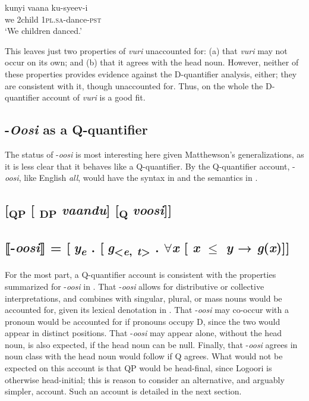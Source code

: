\documentclass[output=paper]{langsci/langscibook}
\begin{document}
\ea
\gll kunyi  vaana    ku-syeev-i\\
     we  2child    1\textsc{pl}.\textsc{sa}{}-dance-\textsc{pst}  \\
\glt ‘We children danced.’
\z

  This leaves just two properties of \textit{vuri} unaccounted for: (a) that \textit{vuri} may not occur on its own; and (b) that it agrees with the head noun. However, neither of these properties provides evidence against the D-quantifier analysis, either; they are consistent with it, though unaccounted for. Thus, on the whole the D-quantifier account of \textit{vuri} is a good fit.

\subsection{{}-\textit{Oosi} as a Q-quantifier}

The status of -\textit{oosi} is most interesting here given Matthewson's generalizations, as it is less clear that\textit{} it behaves like a Q-quantifier. By the Q-quantifier account, -\textit{oosi}, like English \textit{all}, would have the syntax in  and the semantics in .

\subsection{      [\textsubscript{QP} [\textsubscript{ DP} \textit{vaandu}] [\textsubscript{Q} \textit{voosi}]]}
\subsection{      ⟦{}-\textit{oosi}⟧ = [\textit{y}\textit{\textsubscript{e}} . [\textit{g}\textsubscript{<}\textit{\textsubscript{e}}\textsubscript{,} \textit{\textsubscript{t}}\textsubscript{>}\textit{}  . ${\forall}$\textit{x} [ \textit{x} ${\leq}$\textit{ y} → \textit{g}(\textit{x})]]}

For the most part, a Q-quantifier account is consistent with the properties summarized for -\textit{oosi} in . That -\textit{oosi} allows for distributive or collective interpretations, and combines with singular, plural, or mass nouns would be accounted for, given its lexical denotation in . That -\textit{oosi} may co-occur with a pronoun would be accounted for if pronouns occupy D, since the two would appear in distinct positions. That -\textit{oosi} may appear alone, without the head noun, is also expected, if the head noun can be null. Finally, that -\textit{oosi} agrees in noun class with the head noun would follow if Q agrees. What would not be expected on this account is that QP would be head-final, since Logoori is otherwise head-initial; this is reason to consider an alternative, and arguably simpler, account. Such an account is detailed in the next section.
\end{document}
